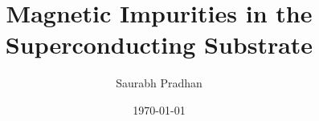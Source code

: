 \documentclass[11pt]{article}
\begin{document}
\title{Magnetic Impurities in the Superconducting Substrate}
\author{Saurabh Pradhan}
\vspace{1cm}
\date{\today}
\end{document}
